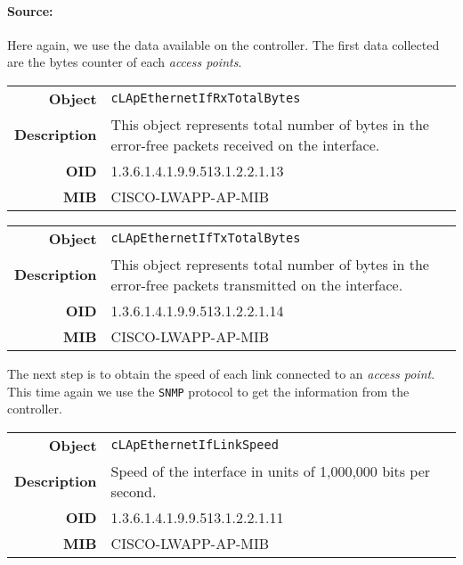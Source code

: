 \paragraph*{Source:} Here again, we use the data available on the controller. The first data collected are the bytes counter of each \emph{access points}.

\begin{tabular}{|r l|}
\hline
\textbf{Object} & \texttt{cLApEthernetIfRxTotalBytes} \\
\textbf{Description} & \parbox{11cm}{This object represents total number of bytes in the error-free packets received on the interface.} \\
\textbf{OID} & 1.3.6.1.4.1.9.9.513.1.2.2.1.13 \\
\textbf{MIB} & CISCO-LWAPP-AP-MIB \\
\hline
\end{tabular}

\begin{tabular}{|r l|}
\hline
\textbf{Object} & \texttt{cLApEthernetIfTxTotalBytes} \\
\textbf{Description} & \parbox{11cm}{This object represents total number of bytes in the error-free packets transmitted on the interface.} \\
\textbf{OID} & 1.3.6.1.4.1.9.9.513.1.2.2.1.14 \\
\textbf{MIB} & CISCO-LWAPP-AP-MIB \\
\hline
\end{tabular}

The next step is to obtain the speed of each link connected to an \emph{access point}. This time again we use the \texttt{SNMP} protocol to get the information from the controller.

\begin{tabular}{|r l|}
\hline
\textbf{Object} & \texttt{cLApEthernetIfLinkSpeed} \\
\textbf{Description} & \parbox{11cm}{Speed of the interface in units of 1,000,000 bits per second.} \\
\textbf{OID} & 1.3.6.1.4.1.9.9.513.1.2.2.1.11 \\
\textbf{MIB} & CISCO-LWAPP-AP-MIB \\
\hline
\end{tabular}

